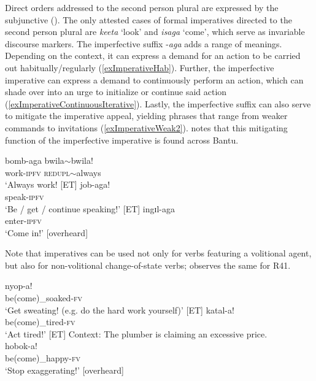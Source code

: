 Direct orders addressed to the second person plural are expressed by the subjunctive (). The only attested cases of formal imperatives directed to the second person plural are \textit{keeta} \lq look' and \textit{isaga} \lq come', which serve as invariable discourse markers. The imperfective suffix -\textit{aga} adds a range of meanings. Depending on the context, it can express a demand for an action to be carried out habitually/regularly (\ref{exImperativeHab}). Further, the imperfective imperative can express a demand to continuously perform an action, which can shade over into an urge to initialize or continue said action (\ref{exImperativeContinuousIterative}). Lastly, the imperfective suffix can also serve to mitigate the imperative appeal, yielding phrases that range from weaker commands to invitations (\ref{exImperativeWeak2}). \citet[192]{NurseD2008} notes that this mitigating function of the imperfective imperative is found across Bantu.
\begin{exe}
\ex \label{exImperativeHab}
\gll bomb-aga bwila$\sim$bwila!\\
work-\textsc{ipfv} \textsc{redupl}$\sim$always\\
\glt `Always work! [ET]
\ex \label{exImperativeContinuousIterative}
\gll job-aga!\\
speak-\textsc{ipfv}\\
\glt `Be / get / continue speaking!' [ET]
\ex \label{exImperativeWeak2}
\gll ingɪl-aga\\
enter-\textsc{ipfv}\\
\glt `Come in!' [overheard]
\end{exe} 

Note that imperatives can be used not only for verbs featuring a volitional agent, but also for non-volitional change-of-state verbs; \textcite[320]{SeidelF2008} observes the same for  R41.
\begin{exe}
\ex\label{exImperativeNonVolitional1} 
\gll nyop-a!\\
be(come)\_soaked-\textsc{fv}\\
\glt `Get sweating! (e.g. do the hard work yourself)' [ET]
\ex \label{exImperativeNonVolitional2} 
\gll katal-a!\\
be(come)\_tired-\textsc{fv}\\
\glt `Act tired!' [ET]
\ex \label{exImperativeNonVolitional3}
Context: The plumber is claiming an excessive price.\\
\gll hobok-a!\\
be(come)\_happy-\textsc{fv}\\
\glt `Stop exaggerating!' [overheard]
\end{exe}

